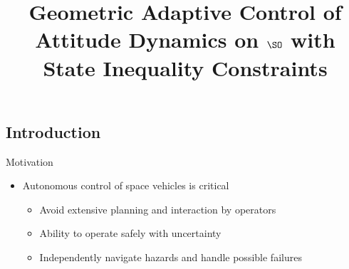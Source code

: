 \documentclass[11pt,professionalfonts]{beamer}
\title[2016 SSPI]{\large\bf  Geometric Adaptive Control of Attitude Dynamics on \(\SO \) with State Inequality Constraints}
\author{\vspace*{-0.3cm}}
\institute{
	\footnotesize
	{\normalsize\bf{Shankar Kulumani and Christopher Poole}}
	\vspace*{0.2cm}
  	\bf{Flight Dynamics \& Control Lab}\\ \vspace*{0.5cm}
 	\begin{figure} %
       	\texttt{[image: gw\_txh\_2cs\_pos]}
  	\end{figure}
}
\date{}
\begin{document}

\setcounter{framenumber}{-1}
\begin{frame} %
  \titlepage
\end{frame}   %

\section*{}
\subsection*{Introduction}  

\begin{frame}[t]{Motivation} %
\begin{itemize}
	\item Autonomous control of space vehicles is critical
	\begin{itemize}
		\item Avoid extensive planning and interaction by operators
		\item Ability to operate safely with uncertainty 
		\item Independently navigate hazards and handle possible failures
	\end{itemize}
\end{itemize}
\end{frame}   %
\end{document}
